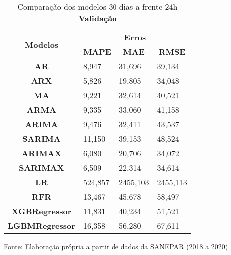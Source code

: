 \begin{table}[H]
	\centering
	\caption{Comparação dos modelos 30 dias a frente 24h \textbf{Validação} }\label{tb:60-24vld}
	\begin{tabular}{@{}clll@{}}
		\toprule
		\multirow{2}{*}{\textbf{Modelos}} & \multicolumn{3}{c}{\textbf{Erros}}                                                                       \\ \cmidrule(l){2-4} 
		& \multicolumn{1}{c}{\textbf{MAPE}} & \multicolumn{1}{c}{\textbf{MAE}} & \multicolumn{1}{c}{\textbf{RMSE}} \\ \hline
\textbf{AR}                       & 8,947                             & 31,696                           & 39,134                            \\
\textbf{ARX}                      & 5,826                             & 19,805                           & 34,048                            \\
\textbf{MA}                       & 9,221                             & 32,614                           & 40,521                            \\
\textbf{ARMA}                     & 9,335                             & 33,060                           & 41,158                            \\
\textbf{ARIMA}                    & 9,476                             & 32,411                           & 43,537                            \\
\textbf{SARIMA}                   & 11,150                            & 39,153                           & 48,524                            \\
\textbf{ARIMAX}                   & 6,080                             & 20,706                           & 34,072                            \\
\textbf{SARIMAX}                  & 6,509                             & 22,314                           & 34,614                            \\
\textbf{LR}        & 524,857                           & 2455,103                         & 2455,113                          \\
\textbf{RFR}  & 13,467                            & 45,678                           & 58,497                            \\
\textbf{XGBRegressor}             & 11,831                            & 40,234                           & 51,521                            \\
\textbf{LGBMRegressor}            & 16,358                            & 56,280                           & 67,611                            \\ \bottomrule
	\end{tabular}

Fonte: Elaboração própria a partir de dados da SANEPAR (2018 a 2020)
\end{table}

